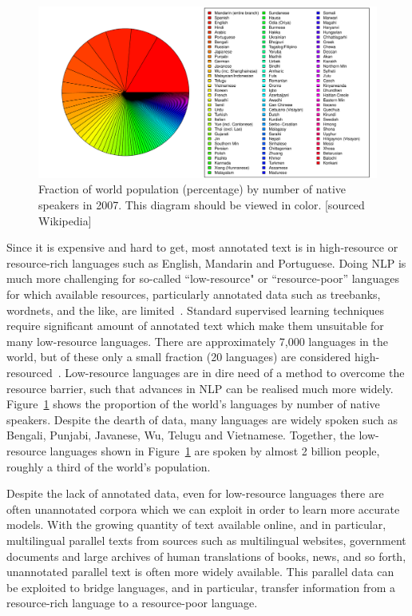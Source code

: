 \documentclass[12pt,twoside,final,hidelinks]{ltthesis}
\theoremstyle{definition}
\begin{document}
\begin{figure}
\centering
\includegraphics[scale=0.4]{Figures/ring_plot_languages}
\caption[Fraction of world population by number of native speakers]{Fraction of world population (percentage) by number of native speakers in 2007. This diagram should be viewed in color. [sourced Wikipedia]}
\label{fig:language_by_speakers}
\end{figure}
Since it is expensive and hard to get, most annotated text is in high-resource or resource-rich languages such as English, Mandarin and Portuguese. Doing NLP is much more challenging for so-called ``low-resource" or ``resource-poor'' languages for which available resources, particularly annotated data such as treebanks, wordnets, and the like, are limited~\cite{AbneyBird2010}. Standard supervised learning techniques require significant amount of annotated text which make them unsuitable for many low-resource languages. There are approximately 7,000 languages in the world, but of these only a small fraction (20 languages) are considered high-resourced~\cite{BAUMANN14}. 
Low-resource languages are in dire need of a method to overcome the resource barrier, such that advances in NLP can be realised much more widely. Figure~\ref{fig:language_by_speakers} shows the proportion of the world's languages by number of native speakers. 
Despite the dearth of data, many languages are widely spoken such as Bengali, Punjabi, Javanese, Wu, Telugu and Vietnamese. Together, the low-resource languages shown in Figure~\ref{fig:language_by_speakers} %
are spoken by almost 2 billion people, roughly a third of the world's population. 

Despite the lack of annotated data, even for low-resource languages there are often unannotated corpora which we can exploit in order to learn more accurate models. With the growing 
quantity of text available online, and in particular, multilingual parallel texts from sources such as multilingual websites, government documents and large archives 
of human translations of books, news, and so forth, unannotated parallel text is often more widely available. This parallel data can be exploited to bridge 
languages, and in particular, transfer information from a resource-rich language to a resource-poor language. 
\end{document}
